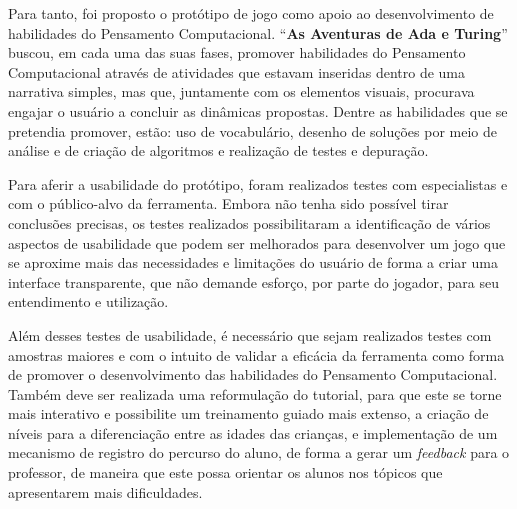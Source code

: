 Para tanto, foi proposto o protótipo de jogo como apoio ao desenvolvimento de habilidades do Pensamento Computacional. “\textbf{As Aventuras de Ada e Turing}” buscou, em cada uma das suas fases, promover habilidades do Pensamento Computacional através de atividades que estavam inseridas dentro de uma narrativa simples, mas que, juntamente com os elementos visuais, procurava engajar o usuário a concluir as dinâmicas propostas. Dentre as habilidades que se pretendia promover, estão: uso de vocabulário, desenho de soluções por meio de análise e de criação de algoritmos e realização de testes e depuração. 

Para aferir a usabilidade do protótipo, foram realizados testes com especialistas e com o público-alvo da ferramenta. Embora não tenha sido possível tirar conclusões precisas, os testes realizados possibilitaram a identificação de vários aspectos de usabilidade que podem ser melhorados para desenvolver um jogo que se aproxime mais das necessidades e limitações do usuário de forma a criar uma interface transparente, que não demande esforço, por parte do jogador, para seu entendimento e utilização. 

Além desses testes de usabilidade, é necessário que sejam realizados testes com amostras maiores e com o intuito de validar a eficácia da ferramenta como forma de promover o desenvolvimento das habilidades do Pensamento Computacional. Também deve ser realizada uma reformulação do tutorial, para que este se torne mais interativo e possibilite um treinamento guiado mais extenso, a criação de níveis para a diferenciação entre as idades das crianças, e implementação de um mecanismo de registro do percurso do aluno, de forma a gerar um \textit{feedback} para o professor, de maneira que este possa orientar os alunos nos tópicos que apresentarem mais dificuldades.

